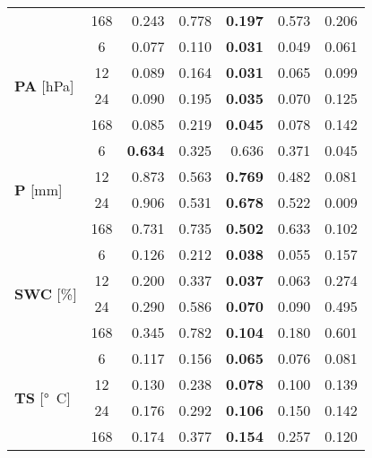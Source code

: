 \begin{table}
\begin{tabular}{p{2.1cm}c|rr|rr|r}
 & 168 & 0.243 & 0.778 & \bfseries 0.197 & 0.573 & 0.206 \\
\cline{1-7}
\multirow[c]{4}{*}{\parbox{2.1cm}{\textbf{PA} [\si{hPa}]}} & 6 & 0.077 & 0.110 & \bfseries 0.031 & 0.049 & 0.061 \\
 & 12 & 0.089 & 0.164 & \bfseries 0.031 & 0.065 & 0.099 \\
 & 24 & 0.090 & 0.195 & \bfseries 0.035 & 0.070 & 0.125 \\
 & 168 & 0.085 & 0.219 & \bfseries 0.045 & 0.078 & 0.142 \\
\cline{1-7}
\multirow[c]{4}{*}{\parbox{2.1cm}{\textbf{P} [\si{mm}]}} & 6 & \bfseries 0.634 & 0.325 & 0.636 & 0.371 & 0.045 \\
 & 12 & 0.873 & 0.563 & \bfseries 0.769 & 0.482 & 0.081 \\
 & 24 & 0.906 & 0.531 & \bfseries 0.678 & 0.522 & 0.009 \\
 & 168 & 0.731 & 0.735 & \bfseries 0.502 & 0.633 & 0.102 \\
\cline{1-7}
\multirow[c]{4}{*}{\parbox{2.1cm}{\textbf{SWC} [\si{\%}]}} & 6 & 0.126 & 0.212 & \bfseries 0.038 & 0.055 & 0.157 \\
 & 12 & 0.200 & 0.337 & \bfseries 0.037 & 0.063 & 0.274 \\
 & 24 & 0.290 & 0.586 & \bfseries 0.070 & 0.090 & 0.495 \\
 & 168 & 0.345 & 0.782 & \bfseries 0.104 & 0.180 & 0.601 \\
\cline{1-7}
\multirow[c]{4}{*}{\parbox{2.1cm}{\textbf{TS} [\si{°C}]}} & 6 & 0.117 & 0.156 & \bfseries 0.065 & 0.076 & 0.081 \\
 & 12 & 0.130 & 0.238 & \bfseries 0.078 & 0.100 & 0.139 \\
 & 24 & 0.176 & 0.292 & \bfseries 0.106 & 0.150 & 0.142 \\
 & 168 & 0.174 & 0.377 & \bfseries 0.154 & 0.257 & 0.120 \\
\cline{1-7}
\bottomrule
\end{tabular}
\end{table}
